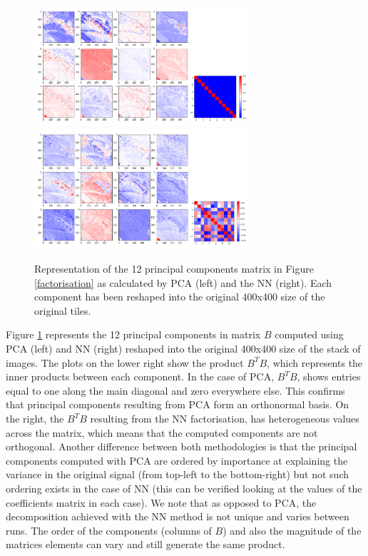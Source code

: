 \documentclass[essd, manuscript]{copernicus}
\begin{document}
\begin{figure}%
    {{\includegraphics[width=8cm]{fig4a.png} }}%
    {{\includegraphics[width=8cm]{fig4b.png} }}%
	\caption{Representation of the 12 principal components matrix in Figure \ref{factorisation} as calculated by PCA (left) and the NN (right). Each component has been reshaped into the original 400x400 size of the original tiles.}%
    \label{pcs}%
\end{figure}

Figure \ref{pcs} represents the 12 principal components in matrix $B$ computed using PCA (left) and NN (right) reshaped into the original 400x400 size of the stack of images. The plots on the lower right show the product $B^TB$, which represents the inner products between each component. In the case of PCA, $B^TB$, shows entries equal to one along the main diagonal and zero everywhere else. This confirms that principal components resulting from PCA form an orthonormal basis. On the right, the $B^TB$ resulting from the NN factorisation, has heterogeneous values across the matrix, which means that the computed components are not orthogonal. Another difference between both methodologies is that the principal components computed with PCA are ordered by importance at explaining the variance in the original signal (from top-left to the bottom-right) but not such ordering exists in the case of NN (this can be verified looking at the values of the coefficients matrix in each case). We note that as opposed to PCA, the decomposition achieved with the NN method is not unique and varies between runs. The order of the components (columns of $B$) and also the magnitude of the matrices elements can vary and still generate the same product.
\end{document}
